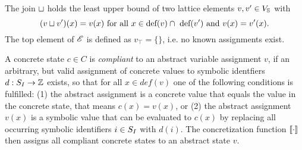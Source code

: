 The join $\sqcup$ holds the least upper bound of two lattice elements $v, v' \in V_{\mathbb{S}}$ with
  \[ (v \sqcup v')(x) = v(x) \text{ for all } x \in \text{def}(v) \cap\ \text{def}(v') \text{ and } v(x) = v'(x) \text{.} \]
The top element of $\mathscr{E}$ is defined as $v_\top = \{\}$, i.e. no known assignments exist.

A concrete state $c \in C$ is \emph{compliant} to an abstract variable assignment $v$, if an arbitrary, but valid assignment of concrete values to symbolic identfiers $d: S_I \rightarrow \mathbb{Z}$ exists, so that for all $x \in def(v)$ one of the following conditions is fulfilled:
(1) the abstract assignment is a concrete value that equals the value in the concrete state, that means $c(x) = v(x)$, or
(2) the abstract assignment $v(x)$ is a symbolic value that can be evaluated to $c(x)$ by replacing all occurring symbolic identifiers $i \in S_I$ with $d(i)$.
The concretization function $[\![ \cdot ]\!]$ then assigns all compliant concrete states to an abstract state $v$.

